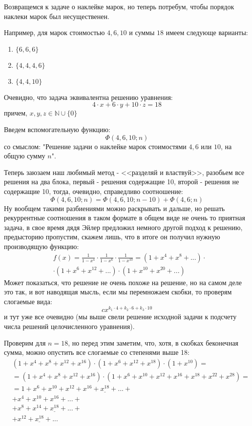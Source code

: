 Возвращемся к задаче о наклейке марок, но теперь потребум, чтобы порядок наклеки марок был несущественен.

Например, для марок стоимостью $4,6,10$ и суммы $18$ имеем следующе варианты:
\begin{enumerate}
\item $\{6, 6, 6\}$

\item $\{4, 4, 4, 6\}$

\item $\{4, 4, 10\}$
\end{enumerate}

Очевидно, что задача эквивалентна решению уравнения:
\[
	4 \cdot x + 6 \cdot y + 10 \cdot z = 18
\]
причем, $x,y,z \in \mathbb{N}\cup\{0\}$

Введем вспомогательную функцию:
\[
	\Phi \left(4, 6, 10; n\right)
\]
со смыслом: "Решение задачи о наклейке марок стоимостями $4, 6$ или $10$, на общую сумму $n$".

Теперь заюзаем наш любимый метод - <<разделяй и властвуй>>, разобьем все решения на два блока, первый - решения содержащие 10, второй - решения не содержащие 10, тогда, очевидно, справедливо соотношение:
\[
	\Phi\left(4,6,10;n\right) = \Phi\left(4,6,10;n-10\right) + \Phi\left(4,6;n\right)
\]
Ну вообщем такими разбиениями можно раскрывать и дальше, но решать рекуррентные соотношения в таком формате в общем виде не очень то приятная задача, в свое время дядя Эйлер предложил немного другой подход к решению, предысторию пропустим, скажем лишь, что в итоге он получил нужную производящую функцию:
\[
	\begin{split}
		&f\left(x\right) = \frac{1}{1-x^4} \cdot \frac{1}{1-x^6} \cdot \frac{1}{1-x^{10}} = \left(1+x^4+x^8+...\right)\cdot\\
		&\cdot\left(1+x^6+x^{12}+...\right)\cdot\left(1+x^{10}+x^{20}+...\right)
	\end{split}
\]
Может показаться, что решение не очень похоже на решение, но на самом деле это так, и вот наводящая мысль, если мы перемножаем скобки, то проверям слогаемые вида:
\[
	c x^{k_1 \cdot 4 + k_2 \cdot 6 + k_3 \cdot 10}
\]
и тут уже все очевидно (мы выше свели решение исходной задачи к подсчету числа решений целочисленного уравнения).

Проверим для $n=18$, но перед этим заметим, что, хотя, в скобках беконечная сумма, можно опустить все слогаемые со степенями выше 18:
\[
	\begin{split}
		& \left(1+x^4+x^8+x^{12}+x^{16}\right)\cdot\left(1+x^6+x^{12}+x^{18}\right)\cdot\left(1+x^{10}\right) = \\
		& = \left(1+x^4+x^8+x^{12}+x^{16}\right)\cdot\left(1+x^6+x^{10}+x^{12}+x^{16}+x^{18}+x^{22}+x^{28}\right) = \\
		& = 1+x^6+x^{10}+x^{12}+x^{16}+\underline{x^{18}}+...+\\
		& +x^4+x^{10}+x^{16}+...+\\
		& +x^8+x^{14}+\underline{x^{18}}+...+\\
		& +x^{12}+\underline{x^{18}}+...
	\end{split}
\]


